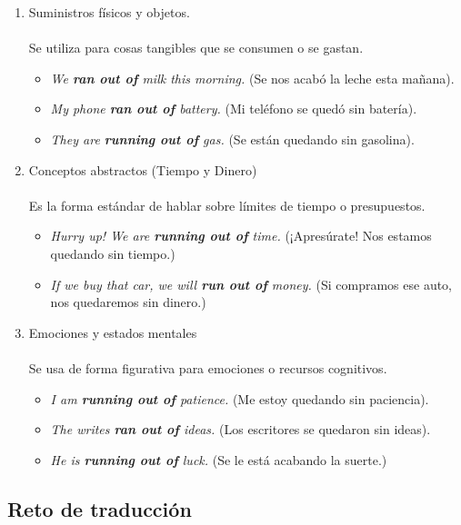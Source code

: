 \documentclass[
10pt, %
a4paper, %
oneside, %
headinclude,footinclude, %
BCOR5mm, %
]{scrartcl}
\begin{document}
\begin{enumerate}[label=\Alph*.]
	\item Suministros físicos y objetos. \\\\
	Se utiliza para cosas tangibles que se consumen o se gastan. \\
	\begin{itemize}
		\item \textit{We \textbf{ran out of} milk this morning.} (Se nos acabó la leche esta mañana).
		\item \textit{My phone \textbf{ran out of} battery.} (Mi teléfono se quedó sin batería).
		\item \textit{They are \textbf{running out of} gas.} (Se están quedando sin gasolina).
	\end{itemize}
	\item Conceptos abstractos (Tiempo y Dinero) \\\\
	Es la forma estándar de hablar sobre límites de tiempo o presupuestos.\\
	\begin{itemize}
		\item \textit{Hurry up! We are \textbf{running out of} time.} (¡Apresúrate! Nos estamos quedando sin tiempo.)
		\item \textit{If we buy that car, we will \textbf{run out of} money.} (Si compramos ese auto, nos quedaremos sin dinero.)
	\end{itemize}
	\item Emociones y estados mentales \\\\
	Se usa de forma figurativa para emociones o recursos cognitivos. \\
	\begin{itemize}
		\item \textit{I am \textbf{running out of} patience.} (Me estoy quedando sin paciencia).
		\item \textit{The writes \textbf{ran out of} ideas.} (Los escritores se quedaron sin ideas).
		\item \textit{He is \textbf{running out of} luck.} (Se le está acabando la suerte.)
	\end{itemize}
\end{enumerate}

\newpage
\subsection{Reto de traducción}
\end{document}
